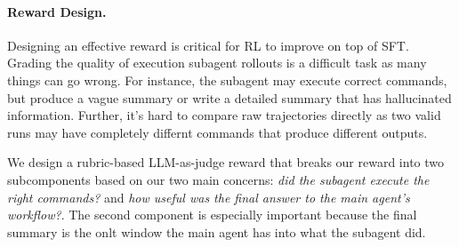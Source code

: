 \documentclass[sigconf,review]{acmart}
\begin{document}
\paragraph{Reward Design.}
Designing an effective reward is critical for RL to improve on top of SFT. Grading the quality of execution subagent rollouts is a difficult task as many things can go wrong. For instance, the subagent may execute correct commands, but produce a vague summary or write a detailed summary that has hallucinated information. Further, it's hard to compare raw trajectories directly as two valid runs may have completely differnt commands that produce different outputs.

We design a rubric-based LLM-as-judge reward that breaks our reward into two subcomponents based on our two main concerns: \textit{did the subagent execute the right commands?} and \textit{how useful was the final answer to the main agent's workflow?}. The second component is especially important because the final summary is the onlt window the main agent has into what the subagent did.
\end{document}
